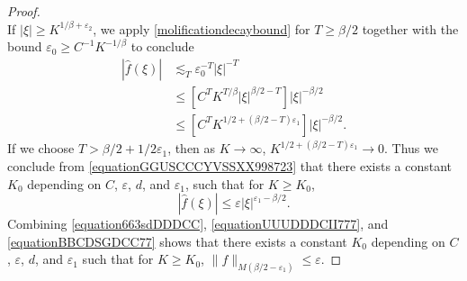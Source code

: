 \documentclass[12pt,reqno]{article}
\numberwithin{equation}{section}
\begin{document}
\begin{proof}
\begin{equation}
    \end{equation}
    If $|\xi| \geq K^{1/\beta + \varepsilon_2}$, we apply \eqref{molificationdecaybound} for $T \geq \beta/2$ together with the bound $\varepsilon_0 \geq C^{-1} K^{-1/\beta}$ to conclude
    \begin{equation} \label{equationGGUSCCCYVSSXX998723}
    \begin{split}
        |\widehat{f}(\xi)| &\lesssim_T \varepsilon_0^{-T} |\xi|^{-T}\\
        &\leq \left[ C^T K^{T/\beta} |\xi|^{\beta/2 - T} \right] |\xi|^{-\beta/2}\\
        &\leq \left[ C^T K^{1/2 + (\beta/2 - T) \varepsilon_1} \right] |\xi|^{-\beta/2}.
    \end{split}
    \end{equation}
    If we choose $T > \beta/2 + 1/2 \varepsilon_1$, then as $K \to \infty$, $K^{1/2 + (\beta/2 - T) \varepsilon_1} \to 0$. Thus we conclude from \eqref{equationGGUSCCCYVSSXX998723} that there exists a constant $K_0$ depending on $C$, $\varepsilon$, $d$, and $\varepsilon_1$, such that for $K \geq K_0$,
    \begin{equation} \label{equationBBCDSGDCC77}
        |\widehat{f}(\xi)| \leq \varepsilon |\xi|^{\varepsilon_1-\beta/2}.
    \end{equation}
    Combining \eqref{equation663sdDDDCC}, \eqref{equationUUUDDDCII777}, and \eqref{equationBBCDSGDCC77} shows that there exists a constant $K_0$ depending on $C$, $\varepsilon$, $d$, and $\varepsilon_1$ such that for $K \geq K_0$, $\| f \|_{M(\beta/2 - \varepsilon_1)} \leq \varepsilon$.
\end{proof}
\end{document}
